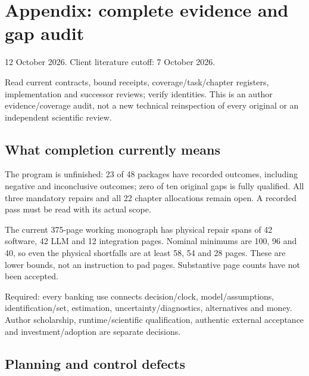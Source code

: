 \documentclass[
  10pt,
]{article}
\begin{document}
\newpage

\hypertarget{appendix-complete-evidence-and-gap-audit}{%
\section{Appendix: complete evidence and gap
audit}\label{appendix-complete-evidence-and-gap-audit}}

12 October 2026. Client literature cutoff: 7 October 2026.

Read current contracts, bound receipts, coverage/task/chapter registers,
implementation and successor reviews; verify identities. This is an
author evidence/coverage audit, not a new technical reinspection of
every original or an independent scientific review.

\hypertarget{what-completion-currently-means}{%
\subsection{What completion currently
means}\label{what-completion-currently-means}}

The program is unfinished: 23 of 48 packages have recorded outcomes,
including negative and inconclusive outcomes; zero of ten original gaps
is fully qualified. All three mandatory repairs and all 22 chapter
allocations remain open. A recorded pass must be read with its actual
scope.

The current 375-page working monograph has physical repair spans of 42
software, 42 LLM and 12 integration pages. Nominal minimums are 100, 96
and 40, so even the physical shortfalls are at least 58, 54 and 28
pages. These are lower bounds, not an instruction to pad pages.
Substantive page counts have not been accepted.

Required: every banking use connects decision/clock, model/assumptions,
identification/set, estimation, uncertainty/diagnostics, alternatives
and money. Author scholarship, runtime/scientific qualification,
authentic external acceptance and investment/adoption are separate
decisions.

\hypertarget{planning-and-control-defects}{%
\subsection{Planning and control
defects}\label{planning-and-control-defects}}
\end{document}
